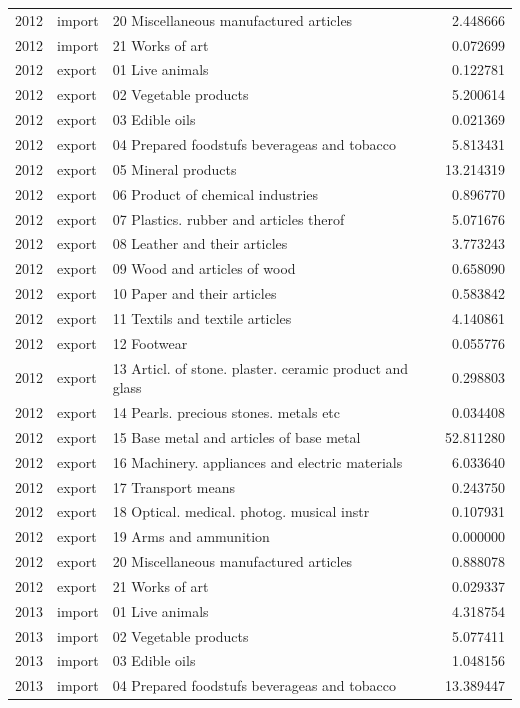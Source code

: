 \begin{tabular}{rllr}
2012 & import & 20 Miscellaneous manufactured articles & 2.448666 \\
2012 & import & 21 Works of art & 0.072699 \\
2012 & export & 01 Live animals & 0.122781 \\
2012 & export & 02 Vegetable products & 5.200614 \\
2012 & export & 03 Edible oils & 0.021369 \\
2012 & export & 04 Prepared foodstufs beverageas and tobacco & 5.813431 \\
2012 & export & 05 Mineral products & 13.214319 \\
2012 & export & 06 Product of chemical industries & 0.896770 \\
2012 & export & 07 Plastics. rubber and articles therof & 5.071676 \\
2012 & export & 08 Leather and their articles & 3.773243 \\
2012 & export & 09 Wood and articles of wood & 0.658090 \\
2012 & export & 10 Paper and their articles & 0.583842 \\
2012 & export & 11 Textils and textile articles & 4.140861 \\
2012 & export & 12 Footwear & 0.055776 \\
2012 & export & 13 Articl. of stone. plaster. ceramic product and glass & 0.298803 \\
2012 & export & 14 Pearls. precious stones. metals etc & 0.034408 \\
2012 & export & 15 Base metal and articles of base metal & 52.811280 \\
2012 & export & 16 Machinery. appliances and electric materials & 6.033640 \\
2012 & export & 17 Transport means & 0.243750 \\
2012 & export & 18 Optical. medical. photog. musical instr & 0.107931 \\
2012 & export & 19 Arms and ammunition & 0.000000 \\
2012 & export & 20 Miscellaneous manufactured articles & 0.888078 \\
2012 & export & 21 Works of art & 0.029337 \\
2013 & import & 01 Live animals & 4.318754 \\
2013 & import & 02 Vegetable products & 5.077411 \\
2013 & import & 03 Edible oils & 1.048156 \\
2013 & import & 04 Prepared foodstufs beverageas and tobacco & 13.389447 \\

\end{tabular}

